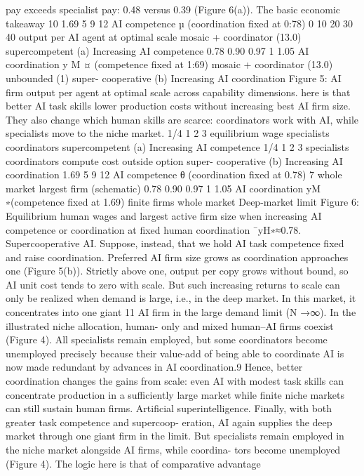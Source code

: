 pay exceeds specialist pay: 0.48 versus 0.39 (Figure 6(a)). The basic economic takeaway
10
1.69
5
9
12
AI competence µ  (coordination fixed at 0:78)
0
10
20
30
40
output per AI agent at optimal scale
mosaic + coordinator (13.0)
supercompetent
(a) Increasing AI competence
0.78
0.90
0.97
1
1.05
AI coordination y M
¤   (competence fixed at 1:69)
mosaic + coordinator (13.0)
unbounded (1)
super-
cooperative
(b) Increasing AI coordination
Figure 5: AI firm output per agent at optimal scale across capability dimensions.
here is that better AI task skills lower production costs without increasing best AI firm
size. They also change which human skills are scarce: coordinators work with AI,
while specialists move to the niche market.
1/4
1
2
3
equilibrium wage
specialists
coordinators
supercompetent
(a) Increasing AI competence
1/4
1
2
3
specialists
coordinators
compute cost
outside option
super-
cooperative
(b) Increasing AI coordination
1.69
5
9
12
AI competence θ (coordination ﬁxed at 0.78)
7
whole
market
largest ﬁrm
(schematic)
0.78
0.90
0.97
1
1.05
AI coordination yM
∗(competence ﬁxed at 1.69)
ﬁnite
ﬁrms
whole
market
Deep-market limit
Figure 6: Equilibrium human wages and largest active firm size when increasing AI
competence or coordination at fixed human coordination ¯yH∗≈0.78.
Supercooperative AI. Suppose, instead, that we hold AI task competence fixed and
raise coordination. Preferred AI firm size grows as coordination approaches one
(Figure 5(b)). Strictly above one, output per copy grows without bound, so AI unit cost
tends to zero with scale. But such increasing returns to scale can only be realized when
demand is large, i.e., in the deep market. In this market, it concentrates into one giant
11
AI firm in the large demand limit (N →∞). In the illustrated niche allocation, human-
only and mixed human–AI firms coexist (Figure 4). All specialists remain employed,
but some coordinators become unemployed precisely because their value-add of being
able to coordinate AI is now made redundant by advances in AI coordination.9 Hence,
better coordination changes the gains from scale: even AI with modest task skills can
concentrate production in a sufficiently large market while finite niche markets can
still sustain human firms.
Artificial superintelligence. Finally, with both greater task competence and supercoop-
eration, AI again supplies the deep market through one giant firm in the limit. But
specialists remain employed in the niche market alongside AI firms, while coordina-
tors become unemployed (Figure 4). The logic here is that of comparative advantage
